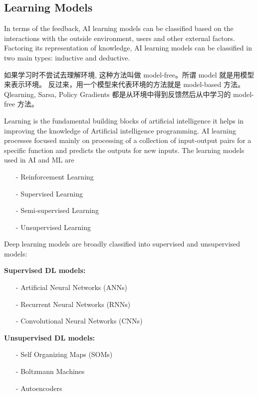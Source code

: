 \subsection{Learning Models}

In terms of the feedback, AI learning models can be classified based on the interactions 
with the outside environment, users and other external factors. Factoring its 
representation of knowledge, AI learning models can be classified in two main types: 
inductive and deductive.


如果学习时不尝试去理解环境, 这种方法叫做 model-free。所谓 model 就是用模型来表示环境。
反过来，用一个模型来代表环境的方法就是 model-based 方法。 Qlearning, Sarsa, 
Policy Gradients 都是从环境中得到反馈然后从中学习的 model-free 方法。

Learning is the fundamental building blocks of artificial intelligence it helps in 
improving the knowledge of Artificial intelligence programming. AI learning processes 
focused mainly on processing of a collection of input-output pairs for a specific 
function and predicts the outputs for new inputs. The learning models used in AI and 
ML are
\begin{itemize}
\setlength{\parskip}{0pt}
\item[-]
Reinforcement Learning

\item[-]
Supervised Learning

\item[-]
Semi-supervised Learning


\item[-]
Unsupervised Learning
\end{itemize}

Deep learning models are broadly classified into supervised and unsupervised 
models:

{\bf Supervised DL models:}
\begin{itemize}
\setlength{\parskip}{0pt}
\item[-]
Artificial Neural Networks (ANNs)

\item[-]
Recurrent Neural Networks (RNNs)

\item[-]
Convolutional Neural Networks (CNNs)
\end{itemize}


{\bf Unsupervised DL models:}
\begin{itemize}
\setlength{\parskip}{0pt}
\item[-]
Self Organizing Maps (SOMs)

\item[-]
Boltzmann Machines

\item[-]
Autoencoders
\end{itemize}

